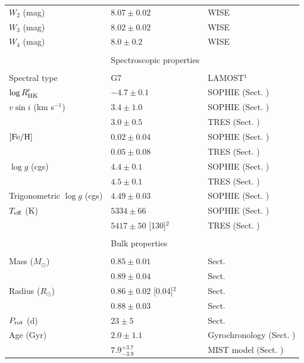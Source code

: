 \documentclass[11pt]{article}
\begin{document}
\begin{table}[htbp]
{\begin{tabular}{lll}
$W_2$ (mag) & $8.07 \pm 0.02$ & WISE \\
$W_3$ (mag) & $8.02 \pm 0.02$ & WISE \\
$W_4$ (mag) & $8.0 \pm 0.2$ & WISE \\
  & &\\
 & Spectroscopic properties &\\
   & &\\
Spectral type & G7 & LAMOST$^{1}$\\
$\log R'_{\rm HK}$ & $-4.7 \pm 0.1$ & SOPHIE (Sect. )\\
$v \sin i$ (km s$^{-1}$) & $3.4 \pm 1.0$ & SOPHIE (Sect. )\\
                       & $3.0 \pm 0.5$ & TRES (Sect. ) \\
$[{\rm Fe/H}]$ & $0.02 \pm 0.04$ & SOPHIE (Sect. )\\
               & $0.05 \pm 0.08$ & TRES (Sect. ) \\
$\log g$ (cgs) & $4.4 \pm 0.1$ & SOPHIE (Sect. )\\
               & $4.5 \pm 0.1$ & TRES (Sect. ) \\
Trigonometric $\log g$ (cgs) & $4.49 \pm 0.03$ & SOPHIE (Sect. )\\                
$T_{\rm eff}$ (K) & $5334 \pm 66$ & SOPHIE (Sect. ) \\
                  & $5417 \pm 50$ [130]$^{2}$ & TRES (Sect. ) \\              
 & &\\ 
 & Bulk properties &\\
 & &\\
Mass ($M_{\odot}$) & $0.85 \pm 0.01$ & Sect.  \\
                  & $0.89 \pm 0.04$ & Sect. \\
Radius ($R_{\odot}$) & $0.86 \pm 0.02$ [0.04]$^{2}$ & Sect.  \\
                      & $0.88 \pm 0.03$ & Sect. \\
$P_{\rm rot}$ (d) & $23 \pm 5$ & Sect. \\
Age (Gyr) & $2.0 \pm 1.1$ & Gyrochronology (Sect. )\\
          & $7.9^{+3.7}_{-3.9}$ & MIST model (Sect. )\\
\hline
\end{tabular}
}
\end{table}
\end{document}
